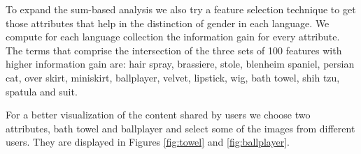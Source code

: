 \documentclass[runningheads]{llncs}
\begin{document}




To expand the sum-based analysis we also try a feature selection
technique to get those attributes that help in the distinction of 
gender in each language. We compute for each language collection the 
information gain for every attribute. 
The terms that comprise the intersection of the three sets of 100 features with higher information gain are: hair spray, brassiere, stole, blenheim spaniel, persian cat, over skirt, miniskirt, ballplayer, velvet, lipstick, wig, bath towel, shih tzu, spatula and suit.

For a better visualization of the content shared by users we 
choose two attributes, bath towel and ballplayer and select some of the images from different users. They are displayed in
Figures \ref{fig:towel} and \ref{fig:ballplayer}.

\end{document}
